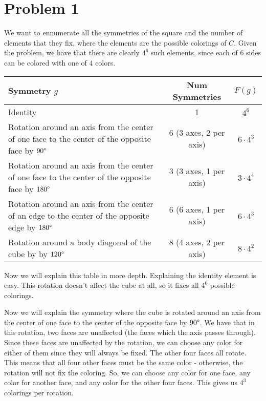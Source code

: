 \documentclass{article}
\begin{document}
\section*{Problem 1}
We want to ennumerate all the symmetries of the square and the number of
elements that they fix, where the elements are the possible colorings
of $C$. Given the problem, we have that there are clearly $4^6$ such elements,
since each of $6$ sides can be colored with one of $4$ colors.

\vspace{3mm}

\begin{tabular}{ | l | c | c | }
    \hline
    Symmetry $g$ & Num Symmetries & $F(g)$ \\ \hline
    Identity & 1 & $4^6$ \\ \hline
    \pbox{40cm}{Rotation around an axis from the \\center of one face to the center
    of the opposite face by $90 \degree$} & 6 (3 axes, 2 per axis) &
    $6 \cdot 4^3$ \\ \hline
    \pbox{40cm}{Rotation around an axis from the \\center of one face to the center
    of the opposite face by $180 \degree$} & 3 (3 axes, 1 per axis) &
    $3 \cdot 4^4$ \\ \hline
    \pbox{40cm}{Rotation around an axis from the \\center of an edge to the center
    of the opposite edge by $180 \degree$} & 6 (6 axes, 1 per axis) &
    $6 \cdot 4^3$ \\ \hline
    \pbox{40cm}{Rotation around a body diagonal of the cube by\\
    by $120 \degree$} & 8 (4 axes, 2 per axis) &
    $8 \cdot 4^2$ \\ \hline
\end{tabular}

\vspace{3mm}

Now we will explain this table in more depth. Explaining the identity element
is easy. This rotation doesn't affect the cube at all, so it fixes all
$4^6$ possible colorings.

Now we will explain the symmetry where the cube is rotated around an axis from
the center of one face to the center of the opposite face by $90 \degree$.
We have that in this rotation, two faces are unaffected (the faces which the
axis passes through). Since these faces are unaffected by the rotation,
we can choose any color for either of them since they will always be fixed.
The other four faces all rotate. This means that all four other faces must be
the same color - otherwise, the rotation will not fix the coloring.
So, we can choose any color for one face, any color for another face,
and any color for the other four faces. This gives us $4^3$ colorings per
rotation.
\end{document}
